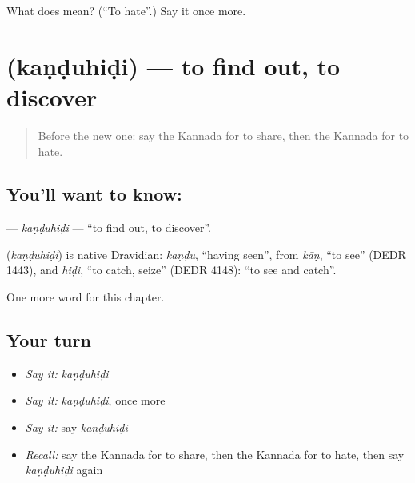 \begin{tcolorbox}[breakable,colback=teal!4,colframe=teal!35!black,title={Before you move on}]
What does  mean? (\textquotedblleft{}To hate\textquotedblright{}.) Say it once more.
\end{tcolorbox}
\section[\texorpdfstring{\kn{ಕಂಡುಹಿಡಿ} (kaṇḍuhiḍi)}{ಕಂಡುಹಿಡಿ (kaṇḍuhiḍi)}]{ (kaṇḍuhiḍi) — to find out, to discover}

\label{lesson:KA-C241-kanduhidi}



\begin{quote}
Before the new one: say the Kannada for to share, then the Kannada for to hate.
\end{quote}

\subsection*{You'll want to know: }
\textbf{} — \emph{kaṇḍuhiḍi} — \textquotedblleft{}to find out, to discover\textquotedblright{}.

\begin{cousinweb}
\textbf{} (\emph{kaṇḍuhiḍi}) is native Dravidian: \emph{kaṇḍu}, \textquotedblleft{}having seen\textquotedblright{}, from \emph{kāṇ}, \textquotedblleft{}to see\textquotedblright{} (DEDR 1443), and \emph{hiḍi}, \textquotedblleft{}to catch, seize\textquotedblright{} (DEDR 4148): \textquotedblleft{}to see and catch\textquotedblright{}.
\end{cousinweb}

\begin{grammarlens}[title={What you've built}]
One more word for this chapter.
\end{grammarlens}

\subsection*{Your turn}
\begin{itemize}
\raggedright
  \item \emph{Say it:} \emph{kaṇḍuhiḍi}
  \item \emph{Say it:} \emph{kaṇḍuhiḍi}, once more
  \item \emph{Say it:} say \emph{kaṇḍuhiḍi}
  \item \emph{Recall:} say the Kannada for to share, then the Kannada for to hate, then say \emph{kaṇḍuhiḍi} again
\end{itemize}

